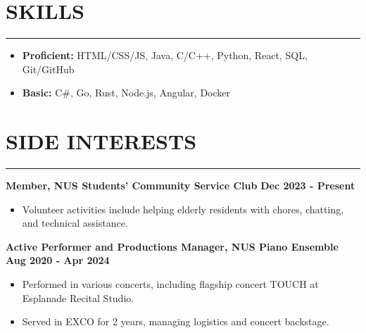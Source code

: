 \documentclass{article}
\begin{document}
\section*{SKILLS}
\vspace{-12pt}
\rule{\textwidth}{3pt}
\begin{itemize}
    \item \textbf{Proficient:} HTML/CSS/JS, Java, C/C++, Python, React, SQL, Git/GitHub
    \item \textbf{Basic:} C\#, Go, Rust, Node.js, Angular, Docker
\end{itemize}

\section*{SIDE INTERESTS}
\vspace{-12pt}
\rule{\textwidth}{3pt}
\textbf{Member, NUS Students' Community Service Club}
\hfill \textbf{Dec 2023 - Present}
\begin{itemize}
    \item Volunteer activities include helping elderly residents with chores, chatting,
    and technical assistance.
\end{itemize}

\noindent \textbf{Active Performer and Productions Manager, NUS Piano Ensemble}
\hfill \textbf{Aug 2020 - Apr 2024}
\begin{itemize}
    \item Performed in various concerts, including flagship concert TOUCH at
    Esplanade Recital Studio.
    \item Served in EXCO for 2 years, managing logistics and concert backstage.
\end{itemize}
\end{document}
